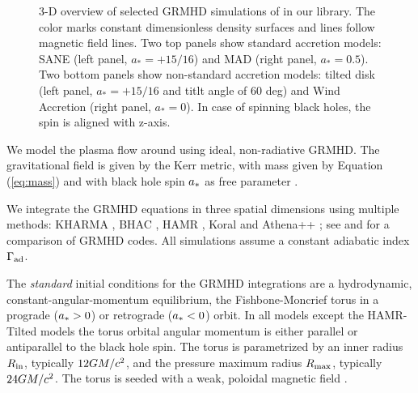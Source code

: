 \begin{figure}
  \caption{3-D overview of selected GRMHD simulations of \sgra in our library. The color marks constant dimensionless density surfaces and lines follow magnetic field lines. Two top panels show standard accretion models: SANE (left panel, $a_*=+15/16$) and MAD (right panel, $a_*=0.5$). Two bottom panels show non-standard accretion models: tilted disk (left panel, $a_*=+15/16$ and titlt angle of 60 deg) and Wind Accretion (right panel, $a_*=0$). In case of spinning black holes, the spin is aligned with z-axis. 
    }
  \label{fig:GRMHD}
\end{figure}

We model the plasma flow around \sgra using ideal, non-radiative GRMHD.  The gravitational field is given by the Kerr metric, with mass given by Equation (\ref{eq:mass}) and with black hole spin $a_*$ as free parameter \citep[see e.g.,][]{2003ApJ...589..444G, 2005ApJ...635..723A, 2007A&A...473...11D}.

We integrate the GRMHD equations in three spatial dimensions using multiple methods: {KHARMA} \citep{2021JOSS....6.3336P}, BHAC \citep{2017ComAC...4....1P}, HAMR \citep{2018MNRAS.474L..81L}, Koral \citep{2013MNRAS.429.3533S} and Athena++ \citep{2016ApJS..225...22W}; see \citealt{2019ApJS..243...26P} and \citet[in prep]{Olivares_et_al} for a comparison of GRMHD codes.  All simulations assume a constant adiabatic index $\Gamma_{\rm ad}$.

The \emph{standard} initial conditions for the GRMHD integrations are a hydrodynamic, constant-angular-momentum equilibrium, the Fishbone-Moncrief torus \citep{1976ApJ...207..962F} in a prograde ($a_* > 0$) or retrograde ($a_* < 0$) orbit.  In all models except the HAMR-Tilted models the torus orbital angular momentum is either parallel or antiparallel to the black hole spin. The torus is parametrized by an inner radius $R_{\rm in}$, typically $12GM/c^2$, and the pressure maximum radius $R_{\rm max}$, typically $24GM/c^2$.
The torus is seeded with a weak, poloidal magnetic field .

